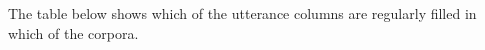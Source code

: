 \documentclass[a4paper, 11pt]{book}
\newcommand{\und}{\underline{{ }}\hspace{0.2mm}}	%
\begin{document}

The table below shows which of the utterance columns are regularly filled in which of the corpora. 
\end{document}
